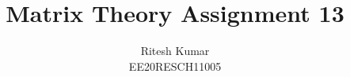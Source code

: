 \documentclass[journal,12pt,twocolumn]{IEEEtran}
\DeclareMathOperator*{\Res}{Res}
\begin{document}
	
	
	\newtheorem{theorem}{Theorem}[section]
	\newtheorem{problem}{Problem}
	\newtheorem{proposition}{Proposition}[section]
	\newtheorem{lemma}{Lemma}[section]
	\newtheorem{corollary}[theorem]{Corollary}
	\newtheorem{example}{Example}[section]
	\newtheorem{definition}[problem]{Definition}
	\newcommand\bigZero[1][17]{\mbox{\fontsize{#1}{0}\selectfont$0$}}
	\newcommand{\BEQA}{\begin{eqnarray}}
	\newcommand{\EEQA}{\end{eqnarray}}
	\newcommand{\define}{\stackrel{\triangle}{=}}
	
	\providecommand{\mbf}{\mathbf}
	\providecommand{\pr}[1]{\ensuremath{\Pr\left(#1\right)}}
	\providecommand{\qfunc}[1]{\ensuremath{Q\left(#1\right)}}
	\providecommand{\sbrak}[1]{\ensuremath{{}\left[#1\right]}}
	\providecommand{\lsbrak}[1]{\ensuremath{{}\left[#1\right.}}
	\providecommand{\rsbrak}[1]{\ensuremath{{}\left.#1\right]}}
	\providecommand{\brak}[1]{\ensuremath{\left(#1\right)}}
	\providecommand{\lbrak}[1]{\ensuremath{\left(#1\right.}}
	\providecommand{\rbrak}[1]{\ensuremath{\left.#1\right)}}
	\providecommand{\cbrak}[1]{\ensuremath{\left\{#1\right\}}}
	\providecommand{\lcbrak}[1]{\ensuremath{\left\{#1\right.}}
	\providecommand{\rcbrak}[1]{\ensuremath{\left.#1\right\}}}
	\theoremstyle{remark}
	\newtheorem{rem}{Remark}
	\newcommand{\sgn}{\mathop{\mathrm{sgn}}}
	\providecommand{\abs}[1]{\left\vert#1\right\vert}
	\providecommand{\res}[1]{\Res\displaylimits_{#1}} 
	\providecommand{\norm}[1]{\left\lVert#1\right\rVert}
	\providecommand{\mtx}[1]{\mathbf{#1}}
	\providecommand{\mean}[1]{E\left[ #1 \right]}
	\providecommand{\fourier}{\overset{\mathcal{F}}{ \rightleftharpoons}}
	\providecommand{\system}{\overset{\mathcal{H}}{ \longleftrightarrow}}
	\newcommand{\solution}{\noindent \textbf{Solution: }}
	\newcommand{\cosec}{\,\text{cosec}\,}
	\providecommand{\dec}[2]{\ensuremath{\overset{#1}{\underset{#2}{\gtrless}}}}
	\newcommand{\myvec}[1]{\ensuremath{\begin{pmatrix}#1\end{pmatrix}}}
	\newcommand{\mydet}[1]{\ensuremath{\begin{vmatrix}#1\end{vmatrix}}}
	\makeatletter
	\makeatother
	\let\StandardTheFigure\thefigure
	\let\vec\mathbf
	\renewcommand{\thefigure}{\theproblem}
	\def\putbox#1#2#3{\makebox[0in][l]{\makebox[#1][l]{}\raisebox{\baselineskip}[0in][0in]{\raisebox{#2}[0in][0in]{#3}}}}
	\def\rightbox#1{\makebox[0in][r]{#1}}
	\def\centbox#1{\makebox[0in]{#1}}
	\def\topbox#1{\raisebox{-\baselineskip}[0in][0in]{#1}}
	\def\midbox#1{\raisebox{-0.5\baselineskip}[0in][0in]{#1}}
	\vspace{3cm}
	\title{Matrix Theory Assignment 13}
	\author{Ritesh Kumar \\ EE20RESCH11005}
	
\end{document}
